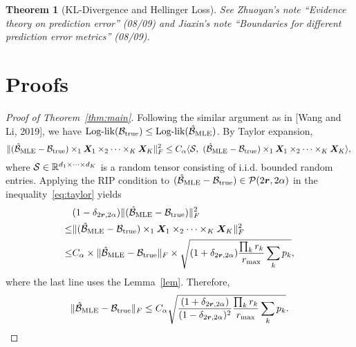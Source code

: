 \documentclass[11pt]{article}
\theoremstyle{plain}
\newtheorem{thm}{Theorem}
\theoremstyle{definition}
\begin{document}
\begin{thm}[KL-Divergence and Hellinger Loss]
See Zhuoyan's note ``Evidence theory on prediction error'' (08/09) and Jiaxin's note ``Boundaries for different prediction error metrics'' (08/09). 
\end{thm}

\section{Proofs}

\begin{proof}[Proof of Theorem~\ref{thm:main}]
Following the similar argument as in [Wang and Li, 2019], we have $\text{Log-lik}(\mathcal{B}_\text{true})\leq \text{Log-lik}(\hat {\mathcal{B}}_{\text{MLE}})$. By Taylor expansion, 
\begin{equation}\label{eq:taylor}
\lVert(\hat {\mathcal{B}}_{\text{MLE}}-\mathcal{B}_{\text{true}})\times_1 \bm X_1\times_2 \cdots\times_K \bm X_K\rVert_F^2 \leq C_\alpha\langle \mathcal{S},\ (\hat {\mathcal{B}}_{\text{MLE}}-\mathcal{B}_{\text{true}})\times_1 \bm X_1\times_2 \cdots\times_K \bm X_K \rangle ,\\
\end{equation}
where $\mathcal{S}\in\mathbb{R}^{d_1\times \cdots \times d_K}$ is a random tensor consisting of i.i.d. bounded random entries. Applying the RIP condition to $(\hat {\mathcal{B}}_{\text{MLE}}-\mathcal{B}_{\text{true}})\in\mathcal{P}(2\bm{r},2\alpha)$ in the inequality~\eqref{eq:taylor} yields
\begin{align}
&(1-\delta_{2\bm{r},2\alpha})\lVert(\hat {\mathcal{B}}_{\text{MLE}}-\mathcal{B}_{\text{true}})\rVert_F^2\\
\leq &\lVert(\hat {\mathcal{B}}_{\text{MLE}}-\mathcal{B}_{\text{true}})\times_1 \bm X_1\times_2 \cdots\times_K \bm X_K\rVert_F^2\\
\leq & C_\alpha\times \lVert\hat {\mathcal{B}}_{\text{MLE}}-\mathcal{B}_{\text{true}}\rVert_F\times \sqrt{ (1+\delta_{2\bm{r},2\alpha}) {\prod_k r_k\over r_{\max}}\sum_k p_k},
\end{align}
where the last line uses the Lemma~\ref{lem}. Therefore,
\[
\lVert\hat {\mathcal{B}}_{\text{MLE}}-\mathcal{B}_{\text{true}}\rVert_F\leq C_\alpha \sqrt{ {(1+\delta_{2\bm{r},2\alpha})\over(1-\delta_{2\bm{r},2\alpha})^2}  {\prod_k r_k \over r_{\max}} \sum_k p_k}.
\]
\end{proof}
\end{document}
